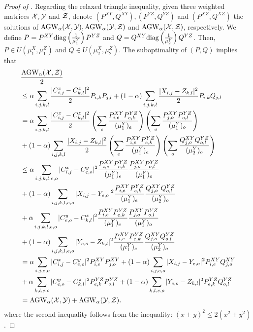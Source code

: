 \begin{proof}[Proof of ]
  Regarding the relaxed triangle inequality, given three weighted matrices $\mathcal X, \mathcal Y$ and $\mathcal Z$,
  denote $(P^{XY}, Q^{XY}), (P^{YZ}, Q^{YZ})$ and $(P^{XZ}, Q^{XZ})$
  the solutions of $\text{AGW}_{\alpha}(\mathcal X, \mathcal Y), \text{AGW}_{\alpha}(\mathcal Y, \mathcal Z)$ and
  $\text{AGW}_{\alpha}(\mathcal X, \mathcal Z)$, respectively. We define
  $P = P^{XY} \text{diag} \left( \frac{1}{\mu_1^Y} \right) P^{YZ}$ and
  $Q = Q^{XY} \text{diag} \left( \frac{1}{\mu_2^Y} \right) Q^{YZ}$. Then,
  $P \in U(\mu_1^X, \mu_1^Z)$ and $Q \in U(\mu_2^X, \mu_2^Z)$.
  The suboptimality of $(P,Q)$ implies that
  \begin{align}
      &\frac{\text{AGW}_{\alpha}(\mathcal X, \mathcal Z)}{2} \\
      &\leq \alpha \sum_{i,j,k,l} \frac{|C^x_{i,j} - C^z_{k,l}|^2}{2} P_{i,k} P_{j, l}
      + (1 - \alpha) \sum_{i,j,k,l} \frac{|X_{i,j} - Z_{k,l}|^2}{2} P_{i,k} Q_{j,l} \\
      &= \alpha \sum_{i,j,k,l} \frac{|C^x_{i,j} - C^z_{k,l}|^2}{2}
      \left( \sum_e \frac{P^{XY}_{i,e} P^{YZ}_{e,k}}{(\mu_1^Y)_e} \right)
      \left(\sum_o \frac{P^{XY}_{j,o} P^{YZ}_{o,l}}{(\mu_1^Y)_o} \right) \\
      &+ (1 - \alpha) \sum_{i,j,k,l} \frac{|X_{i,j} - Z_{k,l}|^2}{2}
      \left(\sum_e \frac{P^{XY}_{i,e} P^{YZ}_{e,k}}{(\mu_1^Y)_e} \right)
      \left( \sum_o \frac{Q^{XY}_{j,o} Q^{YZ}_{o,l}}{(\mu_2^Y)_o} \right) \\
      &\leq \alpha \sum_{i,j,k,l,e,o} |C^x_{i,j} - C^y_{e, o}|^2
      \frac{P^{XY}_{i,e} P^{YZ}_{e,k}}{(\mu_1^Y)_e}
      \frac{P^{XY}_{j,o} P^{YZ}_{o,l}}{(\mu_1^Y)_o} \\
      &+ (1 - \alpha) \sum_{i,j,k,l,e,o} |X_{i,j} - Y_{e,o}|^2
      \frac{P^{XY}_{i,e} P^{YZ}_{e,k}}{(\mu_1^Y)_e}
      \frac{Q^{XY}_{j,o} Q^{YZ}_{o,l}}{(\mu_2^Y)_o} \\
      &+ \alpha \sum_{i,j,k,l,e,o} |C^y_{e,o} - C^z_{k,l}|^2
      \frac{P^{XY}_{i,e} P^{YZ}_{e,k}}{(\mu_1^Y)_e}
      \frac{P^{XY}_{j,o} P^{YZ}_{o,l}}{(\mu_1^Y)_o} \\
      &+ (1 - \alpha) \sum_{i,j,k,l,e,o} |Y_{e, o} - Z_{k,l}|^2
      \frac{P^{XY}_{i,e} P^{YZ}_{e,k}}{(\mu_1^Y)_e}
      \frac{Q^{XY}_{j,o} Q^{YZ}_{o,l}}{(\mu_2^Y)_o} \\
      &= \alpha \sum_{i,j,e,o} |C^x_{i,j} - C^y_{e, o}|^2 P^{XY}_{i,e} P^{XY}_{j,o}
      + (1 - \alpha) \sum_{i,j,e,o} |X_{i,j} - Y_{e,o}|^2 P^{XY}_{i,e} Q^{XY}_{j,o} \\
      &+ \alpha \sum_{k, l, e, o} |C^y_{e,o} - C^z_{k,l}|^2 P^{YZ}_{e,k} P^{YZ}_{o,l}
      + (1 - \alpha) \sum_{k,l,e,o} |Y_{e, o} - Z_{k,l}|^2 P^{YZ}_{e,k} Q^{YZ}_{o,l} \\
      &= \text{AGW}_{\alpha}(\mathcal X, \mathcal Y) + \text{AGW}_{\alpha}(\mathcal Y, \mathcal Z).
  \end{align}
  where the second inequality follows from the inequality: $(x + y)^2 \leq 2(x^2 + y^2)$.
\end{proof}


